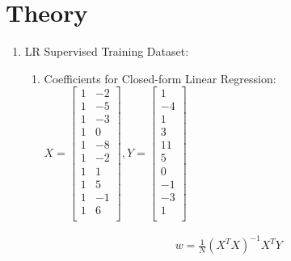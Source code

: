 \documentclass[12pt]{article}
\begin{document}
\maketitle

\section{Theory}

\begin{enumerate}
	\item LR Supervised Training Dataset:


\begin{enumerate}
	
	\item Coefficients for Closed-form Linear Regression:\\

		$
		X=
		\begin{bmatrix}
			1 & -2\\
			1 & -5\\	
			1 & -3\\
			1 & 0\\
			1 & -8\\
			1 & -2\\
			1 & 1\\
			1 & 5\\
			1 & -1\\
			1 & 6\\
		\end{bmatrix},
	Y=
		\begin{bmatrix}
			1\\
			-4\\	
			1\\
			3\\
			11\\
			5\\
			0\\
			-1\\
			-3\\
			1\\
		\end{bmatrix}
		$



	\begin{equation}
		\begin{split}
			w = \frac{1}{N} (X^{T}X)^{-1}X^{T}Y
		\end{split}
	\end{equation}


\end{enumerate}
\end{enumerate}
\end{document}
